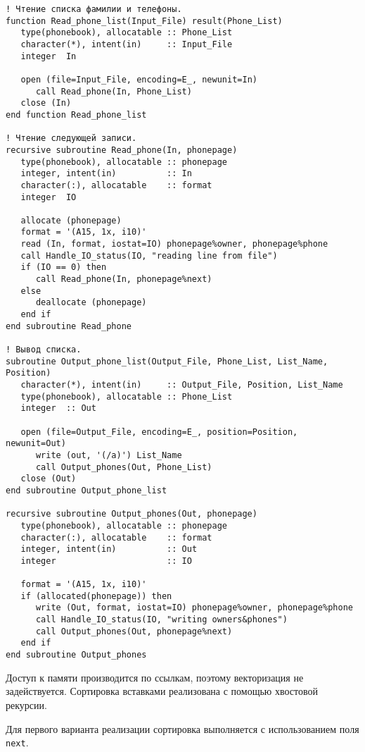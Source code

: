 \documentclass[a4paper,14pt]{article}
\begin{document}
\begin{lstlisting}[caption={Чтение и вывод данных (рекурсивно размещаемый тип)}]
! Чтение списка фамилии и телефоны.
function Read_phone_list(Input_File) result(Phone_List)
   type(phonebook), allocatable :: Phone_List
   character(*), intent(in)     :: Input_File
   integer  In

   open (file=Input_File, encoding=E_, newunit=In)
      call Read_phone(In, Phone_List)
   close (In)
end function Read_phone_list

! Чтение следующей записи.
recursive subroutine Read_phone(In, phonepage)
   type(phonebook), allocatable :: phonepage
   integer, intent(in)          :: In
   character(:), allocatable    :: format
   integer  IO
   
   allocate (phonepage)
   format = '(A15, 1x, i10)'
   read (In, format, iostat=IO) phonepage%owner, phonepage%phone
   call Handle_IO_status(IO, "reading line from file")
   if (IO == 0) then
      call Read_phone(In, phonepage%next)
   else
      deallocate (phonepage)
   end if
end subroutine Read_phone

! Вывод списка.
subroutine Output_phone_list(Output_File, Phone_List, List_Name, Position)
   character(*), intent(in)     :: Output_File, Position, List_Name
   type(phonebook), allocatable :: Phone_List
   integer  :: Out
   
   open (file=Output_File, encoding=E_, position=Position, newunit=Out)
      write (out, '(/a)') List_Name
      call Output_phones(Out, Phone_List)
   close (Out)
end subroutine Output_phone_list

recursive subroutine Output_phones(Out, phonepage)
   type(phonebook), allocatable :: phonepage
   character(:), allocatable    :: format
   integer, intent(in)          :: Out
   integer                      :: IO

   format = '(A15, 1x, i10)'
   if (allocated(phonepage)) then 
      write (Out, format, iostat=IO) phonepage%owner, phonepage%phone 
      call Handle_IO_status(IO, "writing owners&phones")
      call Output_phones(Out, phonepage%next)
   end if
end subroutine Output_phones
\end{lstlisting}


Доступ к памяти производится по ссылкам, поэтому векторизация не задействуется.
Сортировка вставками реализована с помощью хвостовой рекурсии. 

Для первого варианта реализации сортировка выполняется с использованием поля \texttt{next}.
\end{document}

